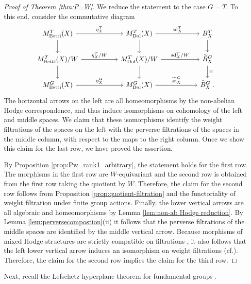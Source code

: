 \documentclass[11pt, a4paper]{amsart}
\theoremstyle{definition}
\theoremstyle{myitemstyle}
\newcommand{\Dol}{{\mathrm{Dol}}}
\newcommand{\Betti}{{\mathrm{Betti}}}
\newcommand{\sd}{{\operatorname{sd}}}
\begin{document}
\begin{proof}[Proof of Theorem \ref{thm:P=W}]
We reduce the statement to the case $G=T$. To this end,  consider the commutative diagram
\[
\begin{tikzcd}
    M_\Betti^{T}(X)
    \arrow[d]
    \arrow[r,"\eta_X^{T}"]& [3em]
        M_\Dol^{T}(X)
        \arrow[d]
        \arrow[r,"\sd_X^{T}"]&[3em]
            B^T_X
            \arrow[d]\\
    M_\Betti^{T}(X)/W 
    \arrow[r,"\eta_X^{T}/W"]
    \arrow[d] &
        M_\Dol^{T}(X)/W
        \arrow[d]
        \arrow[r,"\sd^{T}_X/W"]&
            \widetilde B^G_X
            \arrow[d,"="]\\
    M_\Betti^G(X)
    \arrow[r,"\eta_X^G"]&
        M_\Dol^G(X)
        \arrow[r,"\widetilde\sd^G_X"]&
            \widetilde B^G_X\ .
\end{tikzcd}
\]
The horizontal arrows on the left are all homeomorphisms by the non-abelian Hodge correspondence, and thus induce isomorphisms on cohomology of the left and  middle spaces. We claim that these isomorphisms identify the weight filtrations of the spaces on the left with the perverse filtrations of the spaces in the middle column, with respect to the maps to the right column. Once we show this claim for the last row, we have proved the assertion.

By Proposition \ref{prop:Pw_rank1_arbitrary},  the statement holds for the first row. The morphisms in the first row are $W$-equivariant and the second row is obtained from the first row taking the quotient by $W$. Therefore, the claim for the second row follows from Proposition \ref{prop:quotient-filtration} and the functoriality of weight filtration under finite group actions. Finally, the lower vertical arrows are all algebraic and homeomorphisms by Lemma \ref{lem:non-ab Hodge reduction}. By Lemma \ref{lem:perversecompostion}(ii) it follows that the perverse filtrations of the middle spaces are identified by the middle vertical arrow. Because morphisms of mixed Hodge structures are strictly compatible on filtrations \cite[Theorem 2.3.5]{Del71}, it also follows that the left lower vertical arrow induces an isomorphism on weight filtrations (cf.\cite[Theorem 5.8]{FLS25}). Therefore, the claim for the second row implies the claim for the third row.
\end{proof}

Next, recall the Lefschetz hyperplane theorem for fundamental groups \cite[Theorem 3.1.21]{PAG_I}. %
\end{document}

